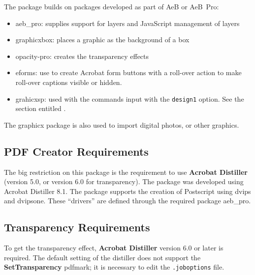 \documentclass{article}
\begin{document}
 The package builds on packages developed as part of \textsf{AeB} or \textsf{AeB~Pro}:
\begin{itemize}
 \item\textsf{aeb\_pro}: supplies support for layers and JavaScript management of layers
 \item\textsf{graphicxbox}: places a graphic as the background of a box
 \item\textsf{opacity-pro}: creates the transparency effects
 \item\textsf{eforms}: use to create Acrobat form buttons with a roll-over action to make
   roll-over captions visible or hidden.
 \item \textsf{grahicxsp}: used with the commands input with the \texttt{design1} option.
 See the section entitled .
\end{itemize}
The \textsf{graphicx} package is also used to import digital photos, or other graphics.


\reversemarginpar

\subsection{PDF Creator Requirements}\label{ss:PDFCreator}

The big restriction on this package is the requirement to use
\textbf{Acrobat Distiller} (version 5.0, or version 6.0 for transparency).
The package was developed using Acrobat Distiller 8.1. The package supports the
creation of Postscript using \textsf{dvips} and \textsf{dvipsone}. These ``drivers''
are defined through the required package \textsf{aeb\_pro}.

\subsection{Transparency Requirements}

To get the transparency effect, \textbf{Acrobat Distiller} version 6.0 or
later is required. The default setting of the distiller does not
support the \textbf{SetTransparency} pdfmark; it is necessary to
edit the \texttt{.joboptions} file.
\end{document}
